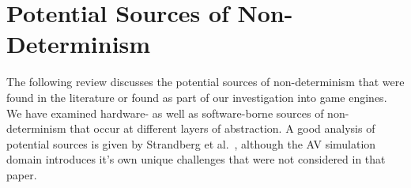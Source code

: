 \documentclass[runningheads,twocolumn,a4paper,10pt]{llncs}
\begin{document}
\section{Potential Sources of Non-Determinism} \label{s:nondeterminisimSources}

The following review discusses the potential sources of non-determinism that were found in the literature or found as part of our investigation into game engines. We have examined hardware- as well as software-borne sources of non-determinism that occur at different layers of abstraction. 
%
%
%
A good analysis of potential sources is given by Strandberg et al.~\cite{intermittently-failing-tests}, although the AV simulation domain introduces it's own unique challenges that were not considered in that paper.



\medskip

\end{document}

